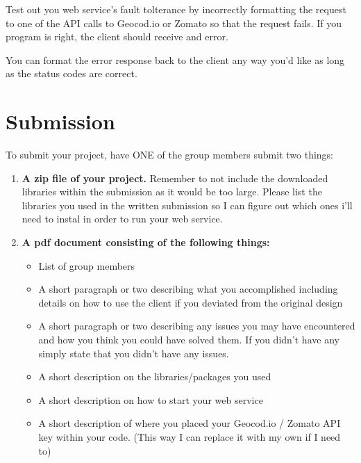 \documentclass{article}
\begin{document}
\begin{info}
Test out you web service's fault tolterance by incorrectly formatting the request to one of the API calls to Geocod.io or Zomato so that the request fails. If you program is right, the client should receive and error. 
\end{info}

\begin{info}
You can format the error response back to the client any way you'd like as long as the status codes are correct. 
\end{info}






\section*{Submission } 
To submit your project, have ONE of the group members submit two things:

\begin{enumerate}
\item \textbf{A zip file of your project.} Remember to not include the downloaded libraries within the submission as it would be too large. Please list the libraries you used in the written submission so I can figure out which ones i'll need to instal in order to run your web service.
\item \textbf{A pdf document consisting of the following things:}
	\begin{itemize}
	\item List of group members
	\item A short paragraph or two describing what you accomplished including details on how to use the client if you deviated from the original design
	\item A short paragraph or two describing any issues you may have encountered and how you think you could have solved them. If you didn't have any simply state that you didn't have any issues.
	\item A short description on the libraries/packages you used
	\item A short description on how to start your web service
	\item A short description of where you placed your Geocod.io / Zomato API key within your code. (This way I can replace it with my own if I need to)
	\end{itemize}
\end{enumerate}
\end{document}
